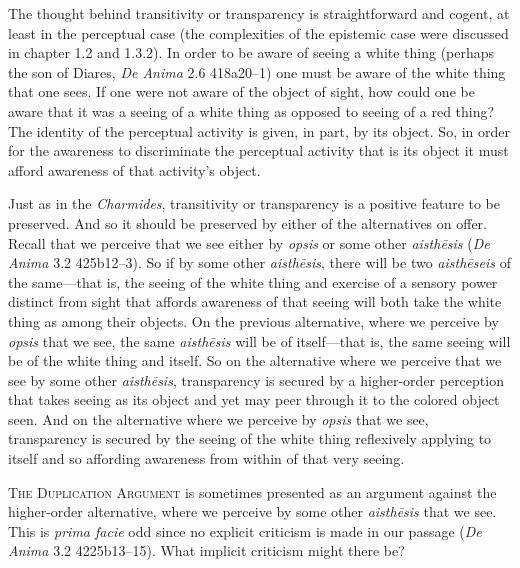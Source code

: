 
The thought behind transitivity or transparency is straightforward and cogent, at least in the perceptual case (the complexities of the epistemic case were discussed in chapter 1.2 and 1.3.2). In order to be aware of seeing a white thing (perhaps the son of Diares, \emph{De Anima} 2.6 418a20–1) one must be aware of the white thing that one sees. If one were not aware of the object of sight, how could one be aware that it was a seeing of a white thing as opposed to seeing of a red thing? The identity of the perceptual activity is given, in part, by its object. So, in order for the awareness to discriminate the perceptual activity that is its object it must afford awareness of that activity's object.

Just as in the \emph{Charmides}, transitivity or transparency is a positive feature to be preserved. And so it should be preserved by either of the alternatives on offer. Recall that we perceive that we see either by \emph{opsis} or some other \emph{aisthēsis} (\emph{De Anima} 3.2 425b12–3). So if by some other \emph{aisthēsis}, there will be two \emph{aisthēseis} of the same—that is, the seeing of the white thing and exercise of a sensory power distinct from sight that affords awareness of that seeing will both take the white thing as among their objects. On the previous alternative, where we perceive by \emph{opsis} that we see, the same \emph{aisthēsis} will be of itself—that is, the same seeing will be of the white thing and itself. So on the alternative where we perceive that we see by some other \emph{aisthēsis}, transparency is secured by a higher-order perception that takes seeing as its object and yet may peer through it to the colored object seen. And on the alternative where we perceive by \emph{opsis} that we see, transparency is secured by the seeing of the white thing reflexively applying to itself and so affording awareness from within of that very seeing. 

\textsc{The Duplication Argument} is sometimes presented as an argument against the higher-order alternative, where we perceive by some other \emph{aisthēsis} that we see. This is \emph{prima facie} odd since no explicit criticism is made in our passage (\emph{De Anima} 3.2 4225b13–15). What implicit criticism might there be?


